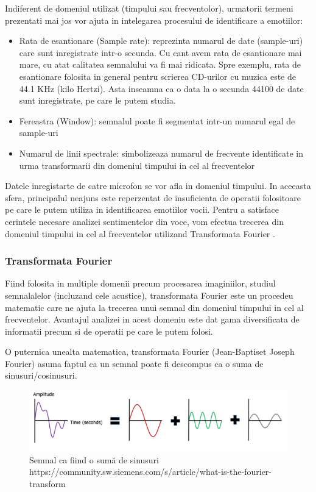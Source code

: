 \documentclass[a4paper, 12pt]{report}
\begin{document}
	Indiferent de domeniul utilizat (timpului sau frecventolor), urmatorii termeni prezentati mai jos vor ajuta in intelegarea procesului de identificare a emotiilor:
	
	\begin{itemize}
		\item Rata de esantionare (Sample rate): reprezinta numarul de date (sample-uri) care sunt inregistrate intr-o secunda. Cu cant avem rata de esantionare mai mare, cu atat calitatea semnalului va fi mai ridicata. Spre exemplu, rata de esantionare folosita in general pentru scrierea CD-urilor cu muzica este de 44.1 KHz (kilo Hertzi). Asta inseamna ca o data la o secunda 44100 de date sunt inregistrate, pe care le putem studia.
		\item Fereastra (Window): semnalul poate fi segmentat intr-un numarul egal de sample-uri
		\item Numarul de linii spectrale: simbolizeaza numarul de frecvente identificate in urma transformarii din domeniul timpului in cel al frecventelor
	\end{itemize}

	Datele inregistarte de catre microfon se vor afla in domeniul timpului. In aceeasta sfera, principalul neajuns este reperzentat de insuficienta de operatii folositoare pe care le putem utiliza in identificarea emotiilor vocii. Pentru a satisface cerintele necesare analizei sentimentelor din voce, vom efectua trecerea din domeniul timpului in cel al frecventelor utilizand Transformata Fourier \cite{ft}.
	
	\clearpage
	\subsubsection{Transformata Fourier}
	Fiind folosita in multiple domenii precum procesarea imaginiilor, studiul semnalalelor (incluzand cele acustice), transformata Fourier este un procedeu matematic care ne ajuta la trecerea unui semnal din domeniul timpului in cel al frecventelor. Avantajul analizei in acest domeniu este dat gama diversificata de informatii precum si de operatii pe care le putem folosi.
	
	O puternica unealta matematica, transformata Fourier (Jean-Baptiset Joseph Fourier) asuma faptul ca un semnal poate fi descompus ca o suma de sinusuri/cosinusuri.
	
	\begin{figure}[h]
		\begin{center}
			\includegraphics[width=\linewidth]{images/signals.png}
		\end{center}
		\caption{Semnal ca fiind o sumă de sinusuri\newline
			\hspace{\linewidth}https://community.sw.siemens.com/s/article/what-is-the-fourier-transform}
		\label{fig:singal_to_sinuses}
	\end{figure}
	
\end{document}
